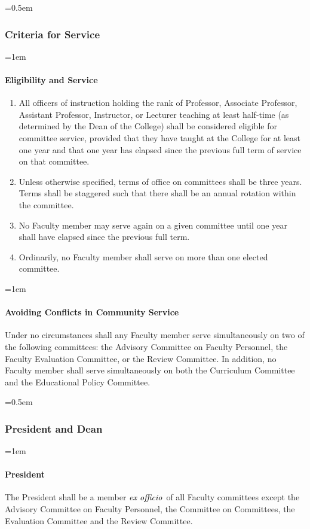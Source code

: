 \documentclass{manual}
\newcommand{\keyword}[1]{\textcolor{black}{#1}}
\newcommand{\exoff}{\keyword{\textit{ex officio}}~}
\let\oldsubsubsection\subsubsection
\renewcommand\subsubsection{\leftskip=0.5em\oldsubsubsection}
\let\oldparagraph\paragraph
\renewcommand\paragraph{\leftskip=1em\oldparagraph}
\newcommand{\itemLevelA}{\alph*.}
\newcommand{\itemRefA}{\alph*}
\begin{document}
\subsubsection{Criteria for Service}

\paragraph{Eligibility and Service}

	\begin{enumerate}[label=\itemLevelA,ref=\itemRefA]
	\item All officers of instruction holding the rank of Professor, Associate Professor, Assistant Professor, Instructor, or Lecturer teaching at least half-time (as determined by the Dean of the College) shall be considered eligible for committee service, provided that they have taught at the College for at least one year and that one year has elapsed since the previous full term of service on that committee.
	\item Unless otherwise specified, terms of office on committees shall be three years. Terms shall be staggered such that there shall be an annual rotation within the committee.
	\item No Faculty member may serve again on a given committee until one year shall have elapsed since the previous full term.
	\item Ordinarily, no Faculty member shall serve on more than one elected committee.
	\end{enumerate}

\paragraph{Avoiding Conflicts in Community Service}
Under no circumstances shall any Faculty member serve simultaneously on two of the following committees: the Advisory Committee on Faculty Personnel, the Faculty Evaluation Committee, or the Review Committee. In addition, no Faculty member shall serve simultaneously on both the Curriculum Committee and the Educational Policy Committee.

\subsubsection{President and Dean}

\paragraph{President}
The President shall be a member \exoff of all Faculty committees except the Advisory Committee on Faculty Personnel, the Committee on Committees, the Evaluation Committee and the Review Committee.
\end{document}
